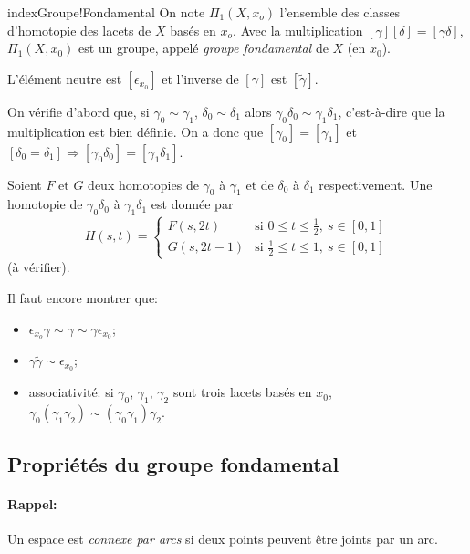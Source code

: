     \begin{theo}[-définition] index{Groupe!Fondamental}
      On note $\Pi_1(X, x_o)$ l'ensemble des classes d'homotopie des lacets de $X$ basés en $x_o$. Avec la
      multiplication $[\gamma][\delta] = [\gamma \delta]$, $\Pi_1(X, x_0)$ est un groupe, appelé \emph{groupe
        fondamental} de $X$ (en $x_0$).

      L'élément neutre est $[\epsilon_{x_0}]$ et l'inverse de $[\gamma]$ est $[\tilde{\gamma}]$.
    \end{theo}

    \begin{preuve}
      On vérifie d'abord que, si $\gamma_0 \sim \gamma_1$, $\delta_0 \sim \delta_1$ alors $\gamma_0\delta_0
      \sim \gamma_1\delta_1$, c'est-à-dire que la multiplication est bien définie. On a donc que $[\gamma_0] =
      [\gamma_1]$ et $[\delta_0 = \delta_1] \Rightarrow [\gamma_0 \delta_0] = [\gamma_1 \delta_1]$. 

      Soient $F$ et $G$ deux homotopies de $\gamma_0$ à $\gamma_1$ et de $\delta_0$ à $\delta_1$
      respectivement. Une homotopie de $\gamma_0\delta_0$ à $\gamma_1\delta_1$ est donnée par 
        \[
        H(s,t) = 
        \begin{cases}
          F(s,2t) & \text{si } 0 \leq t \leq \frac{1}{2},\ s \in [0,1]\\
          G(s, 2t-1) & \text{si } \frac{1}{2} \leq t \leq 1,\ s \in [0,1]
        \end{cases}
        \]
      (à vérifier).

      Il faut encore montrer que:
      \begin{itemize}
      \item $\epsilon_{x_o}\gamma \sim \gamma \sim \gamma \epsilon_{x_0}$;
      \item $\gamma \tilde{\gamma} \sim \epsilon_{x_0}$;
      \item associativité: si $\gamma_0$, $\gamma_1$, $\gamma_2$ sont trois lacets basés en $x_0$,
        $\gamma_0(\gamma_1\gamma_2) \sim (\gamma_0\gamma_1)\gamma_2$.
      \end{itemize}
    \end{preuve}



    \subsection{Propriétés du groupe fondamental}

    \paragraph{Rappel:} Un espace est \emph{connexe par arcs} si deux points peuvent être joints par un arc.

